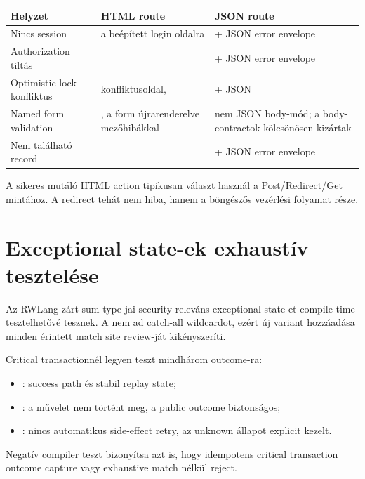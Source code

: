 \begin{longtable}{L{0.27\textwidth}L{0.31\textwidth}L{0.31\textwidth}}
\toprule
Helyzet & HTML route & JSON route \\
\midrule
\endhead
Nincs session &  a beépített login oldalra &  + JSON error envelope \\
\addlinespace
Authorization tiltás &  &  + JSON error envelope \\
\addlinespace
Optimistic-lock konfliktus &  konfliktusoldal,  &  + JSON  \\
\addlinespace
Named form validation & , a form újrarenderelve mezőhibákkal & nem JSON body-mód; a body-contractok kölcsönösen kizártak \\
\addlinespace
Nem található record &  &  + JSON error envelope \\
\bottomrule
\end{longtable}

A sikeres mutáló HTML action tipikusan  választ használ a Post/Redirect/Get mintához. A  redirect tehát nem hiba, hanem a böngészős vezérlési folyamat része.


\section{Exceptional state-ek exhaustív tesztelése}

Az RWLang zárt sum type-jai security-releváns exceptional state-et compile-time tesztelhetővé tesznek. A  nem ad catch-all wildcardot, ezért új variant hozzáadása minden érintett match site review-ját kikényszeríti.

Critical transactionnél legyen teszt mindhárom outcome-ra:

\begin{itemize}
  \item {}: success path és stabil replay state;
  \item {}: a művelet nem történt meg, a public outcome biztonságos;
  \item {}: nincs automatikus side-effect retry, az unknown állapot explicit kezelt.
\end{itemize}

Negatív compiler teszt bizonyítsa azt is, hogy idempotens critical transaction outcome capture vagy exhaustive match nélkül reject.

